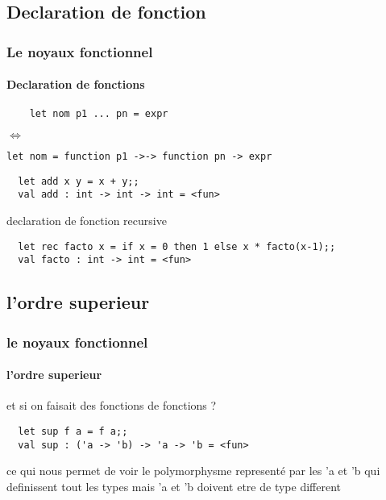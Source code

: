 \subsection{Declaration de fonction}
\begin{frame}[fragile]
  \frametitle{Le noyaux fonctionnel}
  \framesubtitle{Declaration de fonctions}
    \begin{lstlisting}
	let nom p1 ... pn = expr
    \end{lstlisting}
	\begin{center}
	  \begin{rotate}{90}
     $\Leftrightarrow$
   \end{rotate}
\end{center}
\begin{lstlisting}
let nom = function p1 ->-> function pn -> expr
  \end{lstlisting}
  \vspace{1cm}
  \begin{lstlisting}
  let add x y = x + y;;
  val add : int -> int -> int = <fun>
  \end{lstlisting}
  declaration de fonction recursive 
  \begin{lstlisting}
  let rec facto x = if x = 0 then 1 else x * facto(x-1);;
  val facto : int -> int = <fun>
  \end{lstlisting}
\end{frame}

\subsection{l'ordre superieur}
\begin{frame}[fragile]
  \frametitle{le noyaux fonctionnel}
  \framesubtitle{l'ordre superieur}
  et si on faisait des fonctions de fonctions ? 
 \begin{lstlisting}
  let sup f a = f a;;
  val sup : ('a -> 'b) -> 'a -> 'b = <fun>
 \end{lstlisting}
 ce qui nous permet de voir le polymorphysme representé par les 'a et 'b qui definissent tout les types mais 'a et 'b doivent etre de type different
\end{frame}

